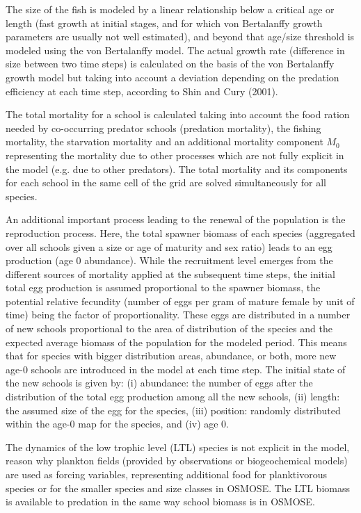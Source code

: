 The size of the fish is modeled by a linear relationship below a critical age or length (fast growth at initial stages, and for which von Bertalanffy growth parameters are usually not well estimated), and beyond that age/size threshold is modeled using the von Bertalanffy model. The actual growth rate (difference in size between two time steps) is calculated on the basis of the von Bertalanffy growth model but taking into account a deviation depending on the predation efficiency at each time step, according to Shin and Cury (2001).


The total mortality for a school is calculated taking into account the food ration needed by co-occurring predator schools (predation mortality), the fishing mortality, the starvation mortality and an additional mortality component $M_0$ representing the mortality due to other processes which are not fully explicit in the model (e.g. due to other predators). The total mortality and its components for each school in the same cell of the grid are solved simultaneously for all species. 

An additional important process leading to the renewal of the population is the reproduction process. Here, the total spawner biomass of each species (aggregated over all schools given a size or age of maturity and sex ratio) leads to an egg production (age 0 abundance). While the recruitment level emerges from the different sources of mortality applied at the subsequent time steps, the initial total egg production is assumed proportional to the spawner biomass, the potential relative fecundity (number of eggs per gram of mature female by unit of time) being the factor of proportionality. These eggs are distributed in a number of new schools proportional to the area of distribution of the species and the expected average biomass of the population for the modeled period. This means that for species with bigger distribution areas, abundance, or both, more new age-0 schools are introduced in the model at each time step. The initial state of the new schools is given by: (i) abundance: the number of eggs after the distribution of the total egg production among all the new schools, (ii) length: the assumed size of the egg for the species, (iii) position: randomly distributed within the age-0 map for the species, and (iv) age 0.

The dynamics of the low trophic level (LTL) species is not explicit in the model, reason why plankton fields (provided by observations or biogeochemical models) are used as forcing variables, representing additional food for planktivorous species or for the smaller species and size classes in OSMOSE. The LTL biomass is available to predation in the same way school biomass is in OSMOSE.

